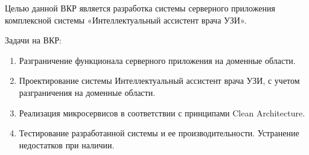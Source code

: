 Целью данной ВКР является разработка системы серверного приложения комплексной системы «Интеллектуальный ассистент врача УЗИ».


Задачи на ВКР:
\begin{enumerate}
    \item Разграничение функционала серверного приложения на доменные области.
    \item Проектирование системы Интеллектуальный ассистент врача УЗИ, с учетом разграничения на доменные области.
    \item Реализация микросервисов в соответствии с принципами Clean Architecture.
	\item Тестирование разработанной системы и ее производительности. Устранение недостатков при наличии.
\end{enumerate}





